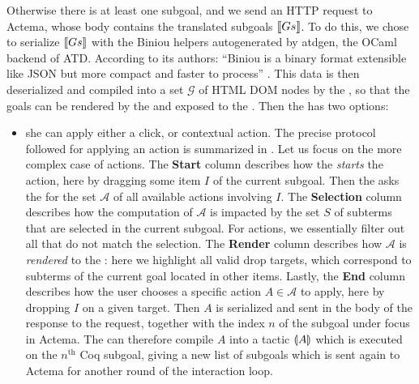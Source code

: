 Otherwise there is at least one subgoal, and we send an  HTTP
request to Actema, whose body contains the translated subgoals $\llbracket Gs \rrbracket$. To
do this, we chose to serialize $\llbracket Gs \rrbracket$ with the Biniou helpers
autogenerated by atdgen, the OCaml backend of ATD. According to its authors:
``Biniou is a binary format extensible like JSON but more compact and faster to
process'' . This data is then deserialized and compiled into a
set $\mathcal{G}$ of HTML DOM nodes by the , so that the goals
can be rendered by the  and exposed to the .
Then the  has two options:
\begin{itemize}
  \item she can apply either a click,  or contextual action. The precise protocol followed for applying an action is
  summarized in . Let us focus on the more complex case
  of  actions. The \textbf{Start} column describes how the 
  \emph{starts} the action, here by dragging some item $I$ of the current
  subgoal. Then the  asks the  for the set
  $\mathcal{A}$ of all available  actions involving $I$. The
  \textbf{Selection} column describes how the computation of $\mathcal{A}$ is
  impacted by the set $S$ of subterms that are selected in the current subgoal.
  For  actions, we essentially filter out all  that do not match the
  selection. The \textbf{Render} column describes how $\mathcal{A}$ is
  \emph{rendered} to the : here we highlight all valid drop
  targets, which correspond to subterms of the current goal located in other
  items. Lastly, the \textbf{End} column describes how
  the user chooses a specific action $A \in \mathcal{A}$ to apply, here by
  dropping $I$ on a given target. Then $A$ is serialized and sent in the body of
  the response to the  request, together with the index $n$ of
  the subgoal under focus in Actema. The  can therefore compile
  $A$ into a tactic $\llparenthesis A \rrparenthesis$ which is executed on the $n^{\text{th}}$ Coq
  subgoal, giving a new list of subgoals which is sent again to Actema for
  another round of the interaction loop.


\end{itemize}
